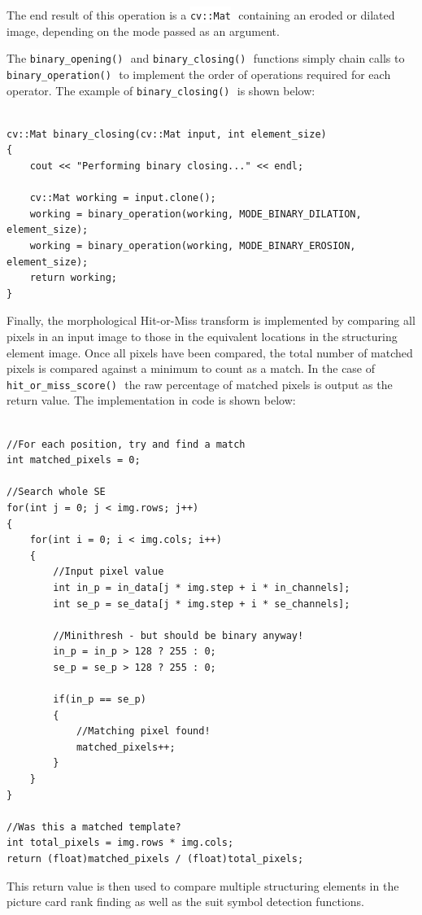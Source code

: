\documentclass[a4paper,12pt,notitlepage]{article}
\newcommand{\code}[1]{\colorbox{white}{\lstinline[basicstyle=\ttfamily\color{black}]|#1|} }
\begin{document}
			The end result of this operation is a \code{cv::Mat} containing an eroded or dilated image, depending on the mode passed as an argument. 

			The \code{binary_opening()} and \code{binary_closing()} functions simply chain calls to \code{binary_operation()} to implement the order of operations required for each operator. The example of \code{binary_closing()} is shown below:

			\begin{lstlisting}

cv::Mat binary_closing(cv::Mat input, int element_size)
{
    cout << "Performing binary closing..." << endl;

    cv::Mat working = input.clone();
    working = binary_operation(working, MODE_BINARY_DILATION, element_size);
    working = binary_operation(working, MODE_BINARY_EROSION, element_size);
    return working;
}
			\end{lstlisting}

			Finally, the morphological Hit-or-Miss transform is implemented by comparing all pixels in an input image to those in the equivalent locations in the structuring element image. Once all pixels have been compared, the total number of matched pixels is compared against a minimum to count as a match. In the case of \code{hit_or_miss_score()} the raw percentage of matched pixels is output as the return value. The implementation in code is shown below:

			\begin{lstlisting}

//For each position, try and find a match
int matched_pixels = 0;

//Search whole SE
for(int j = 0; j < img.rows; j++)
{
    for(int i = 0; i < img.cols; i++)
    {
        //Input pixel value
        int in_p = in_data[j * img.step + i * in_channels];
        int se_p = se_data[j * img.step + i * se_channels];

        //Minithresh - but should be binary anyway!
        in_p = in_p > 128 ? 255 : 0;
        se_p = se_p > 128 ? 255 : 0;

        if(in_p == se_p)
        {
            //Matching pixel found!
            matched_pixels++;
        }
    }
}

//Was this a matched template?
int total_pixels = img.rows * img.cols;
return (float)matched_pixels / (float)total_pixels;
			\end{lstlisting}

			This return value is then used to compare multiple structuring elements in the picture card rank finding as well as the suit symbol detection functions.
\end{document}
